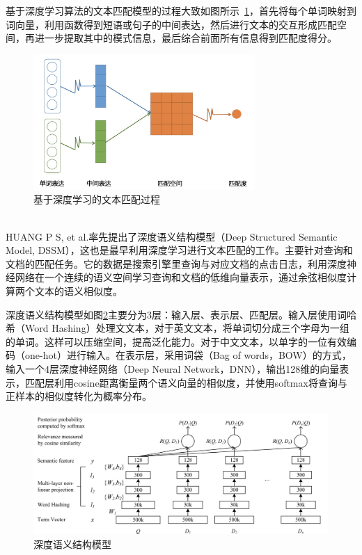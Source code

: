 基于深度学习算法的文本匹配模型的过程大致如图所示~\ref{fig:deep_text_matching}，首先将每个单词映射到词向量，利用函数得到短语或句子的中间表达，然后进行文本的交互形成匹配空间，再进一步提取其中的模式信息，最后综合前面所有信息得到匹配度得分。~\\
\begin{figure}[htbp!]
\centering
\includegraphics[width=0.75\textwidth]{figures/DeepTextMatching.jpg}
\caption{基于深度学习的文本匹配过程}\label{fig:deep_text_matching}
\vspace{-1em}
\end{figure}
~\\HUANG P S, et al.率先提出了深度语义结构模型\cite{Huang2013LearningDS}（Deep Structured Semantic Model, DSSM），这也是最早利用深度学习进行文本匹配的工作。主要针对查询和文档的匹配任务。它的数据是搜索引擎里查询与对应文档的点击日志，利用深度神经网络在一个连续的语义空间学习查询和文档的低维向量表示，通过余弦相似度计算两个文本的语义相似度。

深度语义结构模型如图\ref{fig:DSSM}主要分为3层：输入层、表示层、匹配层。输入层使用词哈希（Word Hashing）处理文文本，对于英文文本，将单词切分成三个字母为一组的单词。这样可以压缩空间，提高泛化能力。对于中文文本，以单字的一位有效编码（one-hot）进行输入。在表示层，采用词袋（Bag of words，BOW）的方式，输入一个4层深度神经网络\cite{hinton2006fast}（Deep Neural Network，DNN），输出128维的向量表示，匹配层利用cosine距离衡量两个语义向量的相似度，并使用softmax将查询与正样本的相似度转化为概率分布。

\begin{figure}[htbp!]
\vspace{1em}
\centering
\includegraphics[width=1.0\textwidth]{figures/DSSM.png}
\caption{深度语义结构模型}\label{fig:DSSM}
\vspace{1em}
\end{figure}

